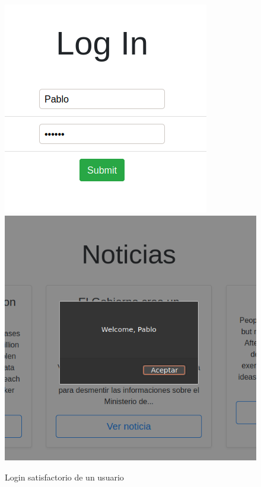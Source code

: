 \documentclass[a4paper,oneside]{article}
\begin{document}
\begin{enumerate}[label=\textbf{\alph*)}]
\begin{figure}[h!]
  \centering
  \includegraphics[scale=0.5]{images/ok_login.png}\\
  \includegraphics[scale=0.5]{images/welcome.png}
  \caption{Login satisfactorio de un usuario}
  \label{fig:ok_login}
\end{figure}


\end{enumerate}
\end{document}

